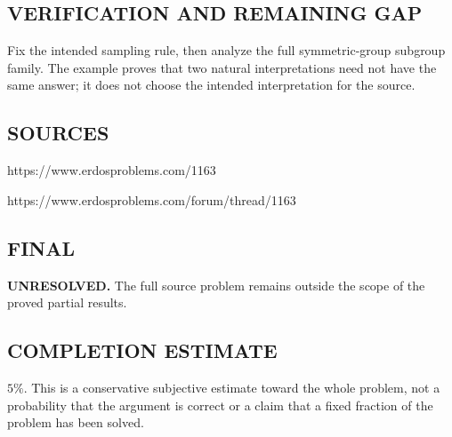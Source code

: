 \subsection*{VERIFICATION AND REMAINING GAP}
Fix the intended sampling rule, then analyze the full symmetric-group
subgroup family. The example proves that two natural interpretations need not
have the same answer; it does not choose the intended interpretation for the source.

\subsection*{SOURCES}
https://www.erdosproblems.com/1163

https://www.erdosproblems.com/forum/thread/1163

\subsection*{FINAL}
\textbf{UNRESOLVED.} The full source problem remains outside the scope of the proved partial results.

\subsection*{COMPLETION ESTIMATE}
$5\%$. This is a conservative subjective estimate toward the whole problem, not a probability that the argument is correct or a claim that a fixed fraction of the problem has been solved.
